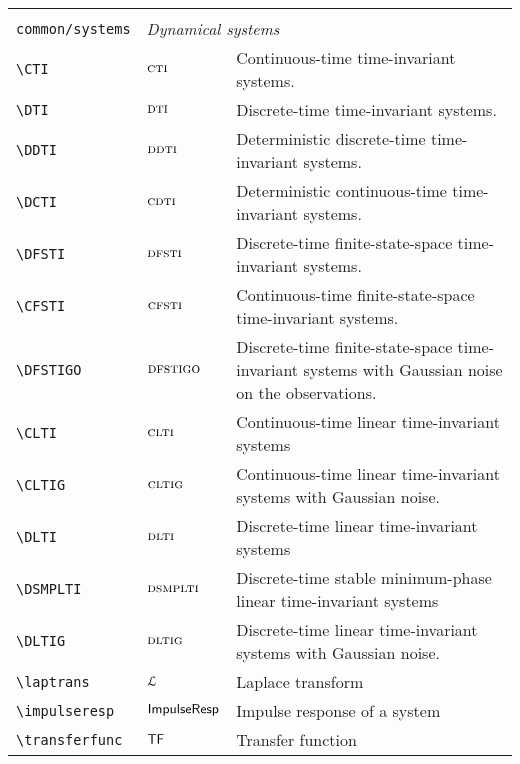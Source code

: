 \begin{longtable}{lll}
  &  & \\ 
 {\color[rgb]{0.5,0.5,0.5}\texttt{common/systems}} & \multicolumn{2}{l}{\emph{Dynamical systems}}\\ 
 \hline
{\color[rgb]{0.5,0.5,0.5}\texttt{\textbackslash CTI}} & $\textsc{cti}$ &  Continuous-time time-invariant systems.\\ 
 {\color[rgb]{0.5,0.5,0.5}\texttt{\textbackslash DTI}} & $\textsc{dti}$ &  Discrete-time time-invariant systems.\\ 
 {\color[rgb]{0.5,0.5,0.5}\texttt{\textbackslash DDTI}} & $\textsc{ddti}$ &  Deterministic discrete-time time-invariant systems.\\ 
 {\color[rgb]{0.5,0.5,0.5}\texttt{\textbackslash DCTI}} & $\textsc{cdti}$ &  Deterministic continuous-time time-invariant systems.\\ 
 {\color[rgb]{0.5,0.5,0.5}\texttt{\textbackslash DFSTI}} & $\textsc{dfsti}$ &  Discrete-time finite-state-space time-invariant systems.\\ 
 {\color[rgb]{0.5,0.5,0.5}\texttt{\textbackslash CFSTI}} & $\textsc{cfsti}$ &  Continuous-time finite-state-space time-invariant systems.\\ 
 {\color[rgb]{0.5,0.5,0.5}\texttt{\textbackslash DFSTIGO}} & $\textsc{dfstigo}$ &  Discrete-time finite-state-space time-invariant systems with Gaussian noise on the observations.\\ 
 {\color[rgb]{0.5,0.5,0.5}\texttt{\textbackslash CLTI}} & $\textsc{clti}$ &  Continuous-time linear time-invariant systems\\ 
 {\color[rgb]{0.5,0.5,0.5}\texttt{\textbackslash CLTIG}} & $\textsc{cltig}$ &  Continuous-time linear time-invariant systems with Gaussian noise.\\ 
 {\color[rgb]{0.5,0.5,0.5}\texttt{\textbackslash DLTI}} & $\textsc{dlti}$ &  Discrete-time linear time-invariant systems\\ 
 {\color[rgb]{0.5,0.5,0.5}\texttt{\textbackslash DSMPLTI}} & $\textsc{dsmplti}$ &  Discrete-time stable minimum-phase linear time-invariant systems\\ 
 {\color[rgb]{0.5,0.5,0.5}\texttt{\textbackslash DLTIG}} & $\textsc{dltig}$ &  Discrete-time linear time-invariant systems with Gaussian noise.\\ 
 {\color[rgb]{0.5,0.5,0.5}\texttt{\textbackslash laptrans}} & $\mathcal{L}$ &  Laplace transform\\ 
 {\color[rgb]{0.5,0.5,0.5}\texttt{\textbackslash impulseresp}} & $\mathsf{ImpulseResp}$ &  Impulse response of a system\\ 
 {\color[rgb]{0.5,0.5,0.5}\texttt{\textbackslash transferfunc}} & $\mathsf{TF}$ &  Transfer function\\ 

\end{longtable}
